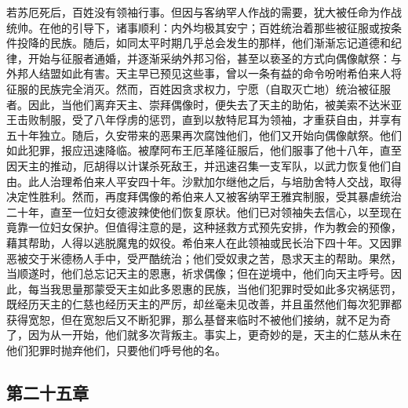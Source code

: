 若苏厄死后，百姓没有领袖行事。但因与客纳罕人作战的需要，犹大被任命为作战统帅。在他的引导下，诸事顺利：内外均极其安宁；百姓统治着那些被征服或按条件投降的民族。随后，如同太平时期几乎总会发生的那样，他们渐渐忘记道德和纪律，开始与征服者通婚，并逐渐采纳外邦习俗，甚至以亵圣的方式向偶像献祭：与外邦人结盟如此有害。天主早已预见这些事，曾以一条有益的命令吩咐希伯来人将征服的民族完全消灭。然而，百姓因贪求权力，宁愿（自取灭亡地）统治被征服者。因此，当他们离弃天主、崇拜偶像时，便失去了天主的助佑，被美索不达米亚王击败制服，受了八年俘虏的惩罚，直到以敖特尼耳为领袖，才重获自由，并享有五十年独立。随后，久安带来的恶果再次腐蚀他们，他们又开始向偶像献祭。他们如此犯罪，报应迅速降临。被摩阿布王厄革隆征服后，他们服事了他十八年，直至因天主的推动，厄胡得以计谋杀死敌王，并迅速召集一支军队，以武力恢复他们自由。此人治理希伯来人平安四十年。沙默加尔继他之后，与培肋舍特人交战，取得决定性胜利。然而，再度拜偶像的希伯来人又被客纳罕王雅宾制服，受其暴虐统治二十年，直至一位妇女德波辣使他们恢复原状。他们已对领袖失去信心，以至现在竟靠一位妇女保护。但值得注意的是，这种拯救方式预先安排，作为教会的预像，藉其帮助，人得以逃脱魔鬼的奴役。希伯来人在此领袖或民长治下四十年。又因罪恶被交于米德杨人手中，受严酷统治；他们受奴隶之苦，恳求天主的帮助。果然，当顺遂时，他们总忘记天主的恩惠，祈求偶像；但在逆境中，他们向天主呼号。因此，每当我思量那蒙受天主如此多恩惠的民族，当他们犯罪时受如此多灾祸惩罚，既经历天主的仁慈也经历天主的严厉，却丝毫未见改善，并且虽然他们每次犯罪都获得宽恕，但在宽恕后又不断犯罪，那么基督来临时不被他们接纳，就不足为奇了，因为从一开始，他们就多次背叛主。事实上，更奇妙的是，天主的仁慈从未在他们犯罪时抛弃他们，只要他们呼号他的名。\par


\subsection{第二十五章}

